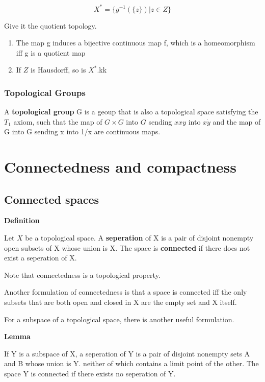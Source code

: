 \documentclass[11pt]{article}
\begin{document}
\[
X^* = \{g^{-1}(\{z\}) \vert z \in Z\}
\]

Give it the quotient topology.

\begin{enumerate}
\item The map g induces a bijective continuous map f, which is a homeomorphism iff g is a quotient map
\item If \(Z\) is Hausdorff, so is \(X^*\).kk
\end{enumerate}


\subsubsection{Topological Groups}
\label{sec:org27ae829}

A \textbf{topological group} G is a geoup that is also a topological space satisfying the \(T_1\) axiom, such that the map of \(G \times G\) into \(G\) sending \(x x y\) into \(x \dot y\) and the map of G into G sending x into 1/x are continuous maps.

\section{Connectedness and compactness}
\label{sec:orge7740ff}

\subsection{Connected spaces}
\label{sec:orgaa1aeca}

\textbf{Definition}

Let \(X\) be a topological space. A \textbf{seperation} of X is a pair of disjoint nonempty open subsets of X whose union is X. The space is \textbf{connected} if there does not exist a seperation of X.

Note that connectedness is a topological property.

Another formulation of connectedness is that a space is connected iff the only subsets that are both open and closed in X are the empty set and X itself.

For a subspace of a topological space, there is another useful formulation.

\textbf{Lemma}

If Y is a subspace of X, a seperation of Y is a pair of disjoint nonempty sets A and B whose union is Y. neither of which contains a limit point of the other. The space Y is connected if there exists no seperation of Y.
\end{document}
